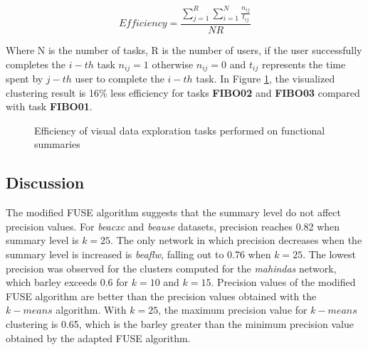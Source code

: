 \documentclass{ieeeaccess}
\begin{document}
\begin{equation}
  Efficiency = \frac{\sum_{j=1}^{R} \sum_{i=1}^{N} \frac{n_{ij}}{t_{ij}}}{NR}
  \label{eq:Efficiency}
\end{equation}

Where N is the number of tasks, R is the number of users, if the user
successfully completes the $i-th$ task $n_{ij} = 1$ otherwise  $n_{ij} = 0$
and $t_{ij}$ represents the time spent by $j-th$ user to complete the $i-th$
task. In Figure \ref{fig:Efficiency}, the visualized clustering result is 
16\% less efficiency for tasks \textbf{FIBO02} and \textbf{FIBO03}
compared with task \textbf{FIBO01}.

\begin{figure}[ht]
    \centering
    \caption{Efficiency of visual data exploration tasks performed on functional summaries}
    \label{fig:Efficiency}
\end{figure}

\subsection{Discussion}

The modified FUSE algorithm suggests that the summary level 
do not affect precision values. For \textit{beacxc} and \textit{beause}
datasets, precision reaches 0.82 when summary level is $k = 25$. The
only network in which precision decreases when the summary level is increased
is \textit{beaflw}, falling out to 0.76 when $k = 25$. The lowest precision was
observed for the clusters computed for the \textit{mahindas} network, which barley 
exceeds 0.6 for $k = 10$ and $k = 15$. Precision values of the modified FUSE algorithm
are better than the precision values obtained
with the $k-means$ algorithm. With $k = 25$, the maximum precision value for $k-means$
clustering is 0.65, which is the barley greater than the minimum precision value obtained
by the adapted FUSE algorithm.
\end{document}
